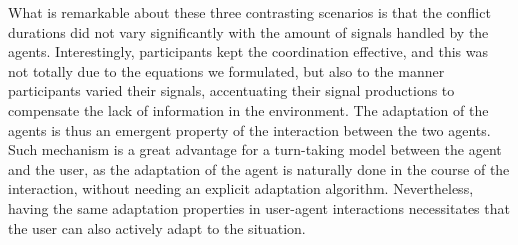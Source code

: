 What is remarkable about these three contrasting scenarios is that the conflict durations did not vary significantly with the amount of signals handled by the agents. Interestingly, participants kept the coordination effective, and this was not totally due to the equations we formulated, but also to the manner participants varied their signals, accentuating their signal productions to compensate the lack of information in the environment. The adaptation of the agents is thus an emergent property of the interaction between the two agents. Such mechanism is a great advantage for a turn-taking model between the agent and the user, as the adaptation of the agent is naturally done in the course of the interaction, without needing an explicit adaptation algorithm. Nevertheless, having the same adaptation properties in user-agent interactions necessitates that the user can also actively adapt to the situation. 